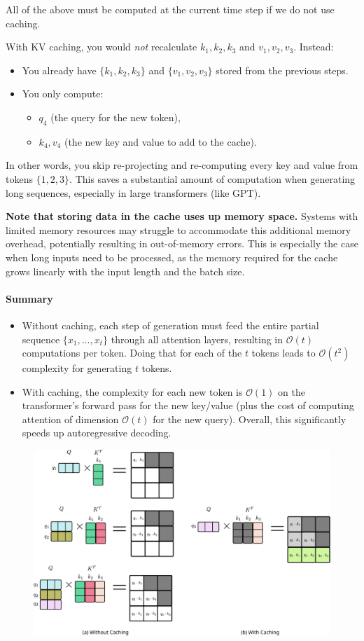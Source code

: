 All of the above must be computed at the current time step if we do not use caching.

With KV caching, you would \emph{not} recalculate \(k_1, k_2, k_3\) and \(v_1, v_2, v_3\). Instead:

\begin{itemize}
	\item You already have \(\{k_1, k_2, k_3\}\) and \(\{v_1, v_2, v_3\}\) stored from the previous steps.  
	\item You only compute:
		\begin{itemize}
			\item \(q_4\) (the query for the new token),
			\item \(k_4, v_4\) (the new key and value to add to the cache).  
		\end{itemize}
\end{itemize}
In other words, you skip re-projecting and re-computing every key and value from tokens \(\{1,2,3\}\). This saves a substantial amount of computation when generating long sequences, especially in large transformers (like GPT).

\textbf{Note that storing data in the cache uses up memory space.} Systems with limited memory resources may struggle to accommodate this additional memory overhead, potentially resulting in out-of-memory errors. This is especially the case when long inputs need to be processed, as the memory required for the cache grows linearly with the input length and the batch size.

\paragraph{Summary}
\begin{itemize}
	\item Without caching, each step of generation must feed the entire partial sequence \(\{x_1, \ldots, x_t\}\) through all attention layers, resulting in \(\mathcal{O}(t)\) computations per token. Doing that for each of the \(t\) tokens leads to \(\mathcal{O}(t^2)\) complexity for generating \(t\) tokens.
	\item With caching, the complexity for each new token is \(\mathcal{O}(1)\) on the transformer's forward pass for the new key/value (plus the cost of computing attention of dimension \(\mathcal{O}(t)\) for the new query). Overall, this significantly speeds up autoregressive decoding.
\end{itemize}


\begin{figure}[t]
	\centering
	\includegraphics[scale=0.8]{./images/transformer/kv_caching.pdf}
\end{figure}

